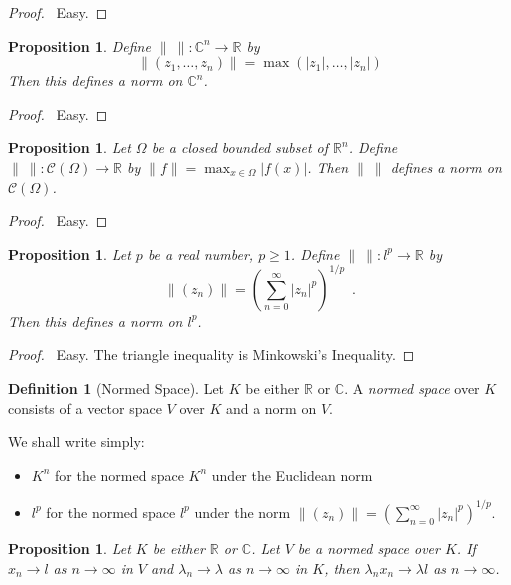 \documentclass{book}
\let\qed\relax
\newtheorem{prop}[ax]{Proposition}
\theoremstyle{definition}
\newtheorem{df}[ax]{Definition}
\begin{document}
\begin{proof}
\pf\ Easy. \qed
\end{proof}

\begin{prop}
Define $\|\ \| : \mathbb{C}^n \rightarrow \mathbb{R}$ by
\[ \| (z_1, \ldots, z_n) \| = \max(|z_1|, \ldots, |z_n|) \]
Then this defines a norm on $\mathbb{C}^n$.
\end{prop}

\begin{proof}
\pf\ Easy. \qed
\end{proof}

\begin{prop}
Let $\Omega$ be a closed bounded subset of $\mathbb{R}^n$. Define $\|\ \| : \mathcal{C}(\Omega) \rightarrow \mathbb{R}$ by $\| f \| = \max_{x \in \Omega} |f(x)|$. Then $\|\ \|$ defines a norm on $\mathcal{C}(\Omega)$.
\end{prop}

\begin{proof}
\pf\ Easy. \qed
\end{proof}

\begin{prop}
Let $p$ be a real number, $p \geq 1$. Define $\|\ \| : l^p \rightarrow \mathbb{R}$ by
\[ \| (z_n) \| = \left( \sum_{n=0}^\infty |z_n|^p \right)^{1/p} \enspace . \]
Then this defines a norm on $l^p$.
\end{prop}

\begin{proof}
\pf\ Easy. The triangle inequality is Minkowski's Inequality. \qed
\end{proof}

\begin{df}[Normed Space]
Let $K$ be either $\mathbb{R}$ or $\mathbb{C}$. A \emph{normed space} over $K$ consists of a vector space $V$ over $K$ and a norm on $V$.
\end{df}

We shall write simply:
\begin{itemize}
\item $K^n$ for the normed space $K^n$ under the Euclidean norm
\item $l^p$ for the normed space $l^p$ under the norm $\| (z_n) \| = \left( \sum_{n=0}^\infty |z_n|^p \right)^{1/p}$.
\end{itemize}

\begin{prop}
Let $K$ be either $\mathbb{R}$ or $\mathbb{C}$.
Let $V$ be a normed space over $K$. If $x_n \rightarrow l$ as $n \rightarrow \infty$ in $V$ and $\lambda_n \rightarrow \lambda$ as $n \rightarrow \infty$ in $K$, then $\lambda_n x_n \rightarrow \lambda l$ as $n \rightarrow \infty$.
\end{prop}
\end{document}
